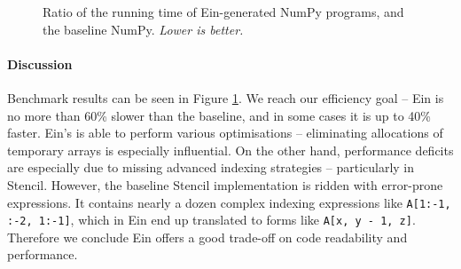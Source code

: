 \begin{figure}[b]
    \centering


    \caption{Ratio of the running time of Ein-generated NumPy programs, and the baseline NumPy. \textit{Lower is better.}}
    \label{fig:benchmark-results}
\end{figure}


\paragraph{Discussion} Benchmark results can be seen in Figure \ref{fig:benchmark-results}. 
We reach our efficiency goal -- Ein is no more than 60\% slower than the baseline, and in some cases it is up to 40\% faster.
Ein's is able to perform various optimisations -- eliminating allocations of temporary arrays is especially influential. 
On the other hand, performance deficits are especially due to missing advanced indexing strategies -- particularly in Stencil.
However, the baseline Stencil implementation is ridden with error-prone expressions. 
It contains nearly a dozen complex indexing expressions like \texttt{A[1:-1, :-2, 1:-1]}, which in Ein end up translated to forms like \texttt{A[x, y - 1, z]}.
Therefore we conclude Ein offers a good trade-off on code readability and performance.



